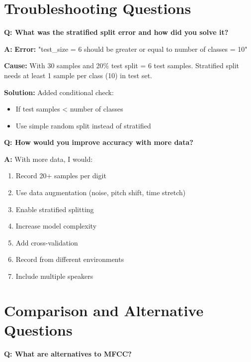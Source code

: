 \documentclass[a4paper,12pt]{article}
\newcommand{\vivaQ}[1]{\textcolor{questioncolor}{\textbf{Q: #1}}}
\newcommand{\vivaA}[1]{\textcolor{answercolor}{\textbf{A:}} #1}
\begin{document}
\section{Troubleshooting Questions}

\vivaQ{What was the stratified split error and how did you solve it?}

\vivaA{\textbf{Error:} "test\_size = 6 should be greater or equal to number of classes = 10"

\textbf{Cause:} With 30 samples and 20\% test split = 6 test samples. Stratified split needs at least 1 sample per class (10) in test set.

\textbf{Solution:} Added conditional check:
\begin{itemize}
    \item If test samples < number of classes
    \item Use simple random split instead of stratified
\end{itemize}}

\vspace{0.5cm}

\vivaQ{How would you improve accuracy with more data?}

\vivaA{With more data, I would:
\begin{enumerate}
    \item Record 20+ samples per digit
    \item Use data augmentation (noise, pitch shift, time stretch)
    \item Enable stratified splitting
    \item Increase model complexity
    \item Add cross-validation
    \item Record from different environments
    \item Include multiple speakers
\end{enumerate}}

\section{Comparison and Alternative Questions}

\vivaQ{What are alternatives to MFCC?}
\end{document}
